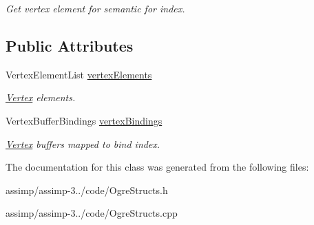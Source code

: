 \begin{DoxyCompactItemize}
\begin{DoxyCompactList}\small\item\em Get vertex element for {\ttfamily semantic} for {\ttfamily index}. \end{DoxyCompactList}\end{DoxyCompactItemize}
\subsection*{Public Attributes}
\begin{DoxyCompactItemize}
\item 
\hypertarget{class_assimp_1_1_ogre_1_1_vertex_data_a09bed72f588c53aae3d68db85c25e194}{Vertex\+Element\+List \hyperlink{class_assimp_1_1_ogre_1_1_vertex_data_a09bed72f588c53aae3d68db85c25e194}{vertex\+Elements}}\label{class_assimp_1_1_ogre_1_1_vertex_data_a09bed72f588c53aae3d68db85c25e194}

\begin{DoxyCompactList}\small\item\em \hyperlink{class_assimp_1_1_vertex}{Vertex} elements. \end{DoxyCompactList}\item 
\hypertarget{class_assimp_1_1_ogre_1_1_vertex_data_a9803611a8aed4b54dd3b927f745ef8ee}{Vertex\+Buffer\+Bindings \hyperlink{class_assimp_1_1_ogre_1_1_vertex_data_a9803611a8aed4b54dd3b927f745ef8ee}{vertex\+Bindings}}\label{class_assimp_1_1_ogre_1_1_vertex_data_a9803611a8aed4b54dd3b927f745ef8ee}

\begin{DoxyCompactList}\small\item\em \hyperlink{class_assimp_1_1_vertex}{Vertex} buffers mapped to bind index. \end{DoxyCompactList}\end{DoxyCompactItemize}


The documentation for this class was generated from the following files\+:\begin{DoxyCompactItemize}
\item 
assimp/assimp-\/3../code/Ogre\+Structs.\+h\item 
assimp/assimp-\/3../code/Ogre\+Structs.\+cpp\end{DoxyCompactItemize}
